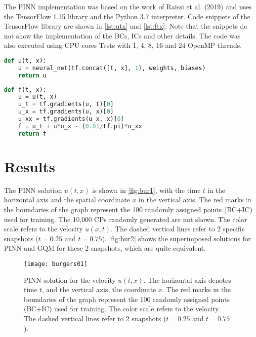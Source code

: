 \documentclass[conference]{IEEEtran}
\begin{document}
The PINN implementation was based on the work of Raissi et al. (2019) \cite{Raissi2019} and uses the TensorFlow 1.15 library and the Python 3.7 interpreter. Code snippets of the TensorFlow library are shown in \autoref {lst:utx} and \autoref {lst:ftx}. Note that the snippets do not show the implementation of the BCs, ICs and other details. The code was also executed using CPU cores Tests with 1, 4, 8, 16 and 24 OpenMP threads.

\begin{lstlisting}[language=Python, label=lst:utx, caption={Code snippet that implements $u(t,x)$}]
def u(t, x):
    u = neural_net(tf.concat([t, x], 1), weights, biases)
    return u
\end{lstlisting}

\begin{lstlisting}[language=Python, label=lst:ftx, caption={Code snippet that implements $f(t,x)$}]
def f(t, x):
    u = u(t, x)
    u_t = tf.gradients(u, t)[0]
    u_x = tf.gradients(u, x)[0]
    u_xx = tf.gradients(u_x, x)[0]
    f = u_t + u*u_x - (0.01/tf.pi)*u_xx
    return f
\end{lstlisting}

%
\section{Results}\label{sec:resu}

The PINN solution $u(t,x)$ is shown in \autoref{fig:bur1}, with the time $t$ in the horizontal axis  and the spatial coordinate $x$ in the vertical axis. The red marks in the boundaries of the graph represent the 100 randomly assigned points (BC+IC) used for training. The 10,000 CPs randomly generated are not shown. The color scale refers to the velocity $u(x,t)$. The dashed vertical lines refer to 2 specific snapshots ($t=0.25$ and $t=0.75$). \autoref {fig:bur2} shows the superimposed solutions for PINN and GQM for these 2 snapshots, which are quite equivalent.

\begin{figure}[htb]
\centering
\texttt{[image: burgers01]}
\caption{PINN solution for the velocity $u(t,x)$. The horizontal axis denotes time $t$, and the vertical axis, the coordinate $x$. The red marks in the boundaries of the graph represent the 100 randomly assigned points (BC+IC) used for training. The color scale refers to the velocity. The dashed vertical lines refer to 2 snapshots ($t=0.25$ and $t=0.75$).} 
\label{fig:bur1}
\end{figure}
\end{document}
